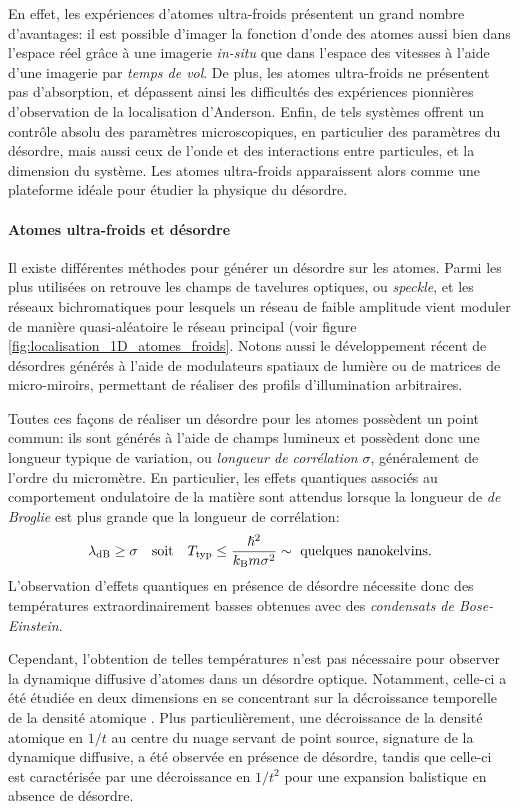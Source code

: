 En effet, les expériences d'atomes ultra-froids présentent un grand nombre d'avantages: il est possible d'imager la fonction d'onde des atomes aussi bien dans l'espace réel grâce à une imagerie \emph{in-situ} que dans l'espace des vitesses à l'aide d'une imagerie par \emph{temps de vol}. De plus, les atomes ultra-froids ne présentent pas d'absorption, et dépassent ainsi les difficultés des expériences pionnières d'observation de la localisation d'Anderson. Enfin, de tels systèmes offrent un contrôle absolu des paramètres microscopiques, en particulier des paramètres du désordre, mais aussi ceux de l'onde et des interactions entre particules, et la dimension du système. Les atomes ultra-froids apparaissent alors comme une plateforme idéale pour étudier la physique du désordre.


\paragraph*{Atomes ultra-froids et désordre}
Il existe différentes méthodes pour générer un désordre sur les atomes. Parmi les plus utilisées on retrouve les champs de tavelures optiques, ou \emph{speckle}, et les réseaux bichromatiques pour lesquels un réseau de faible amplitude vient moduler de manière quasi-aléatoire le réseau principal (voir figure \ref{fig:localisation_1D_atomes_froids}. Notons aussi le développement récent de désordres générés à l'aide de modulateurs spatiaux de lumière ou de matrices de micro-miroirs, permettant de réaliser des profils d'illumination arbitraires.

Toutes ces façons de réaliser un désordre pour les atomes possèdent un point commun: ils sont générés à l'aide de champs lumineux et possèdent donc une longueur typique de variation, ou \emph{longueur de corrélation} $\sigma$, généralement de l'ordre du micromètre. En particulier, les effets quantiques associés au comportement ondulatoire de la matière sont attendus lorsque la longueur de \emph{de Broglie} est plus grande que la longueur de corrélation:
\begin{equation}
\lambda_{\mathrm{dB}}\geq\sigma \quad \text{soit} \quad T_{\mathrm{typ}} \leq \frac{\hslash^2}{ k_{\mathrm{B}} m \sigma^2}\sim \text{ quelques nanokelvins.}
\end{equation}
L'observation d'effets quantiques en présence de désordre nécessite donc des températures extraordinairement basses obtenues avec des \emph{condensats de Bose-Einstein}. 

Cependant, l'obtention de telles températures n'est pas nécessaire pour observer la dynamique diffusive d'atomes dans un désordre optique. Notamment, celle-ci a été étudiée en deux dimensions en se concentrant sur la décroissance temporelle de la densité atomique \citep{robert2010anisotropic}. Plus particulièrement, une décroissance de la densité atomique en $1/t$ au centre du nuage servant de point source, signature de la dynamique diffusive, a été observée en présence de désordre, tandis que celle-ci est caractérisée par une décroissance en $1/t^2$ pour une expansion balistique en absence de désordre.



